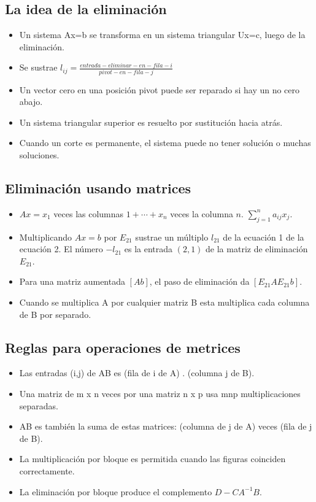 \documentclass[]{article}
\begin{document}
\subsection{La idea de la eliminaci\'on}

\begin{itemize}
	\item Un sistema Ax=b se transforma en un sistema triangular Ux=c, luego de la eliminación.
	\item Se sustrae $l_{ij}=\frac{entrada-eliminar-en-fila-i}{pivot-en-fila-j}$
	\item Un vector cero en una posición pivot puede ser reparado si hay un no cero abajo.
	\item Un sistema triangular superior es resuelto por sustitución hacia atrás.
	\item Cuando un corte es permanente, el sistema puede no tener solución o muchas soluciones.
\end{itemize}

\subsection{Eliminaci\'on usando matrices}

\begin{itemize}
	\item $Ax=x_{1}$ veces las columnas $1+\cdots+x_{n}$ veces la columna $n$. $\sum_{j=1}^n a_{ij}x_{j}$.
	\item Multiplicando $Ax=b$ por $E_{21}$ sustrae un múltiplo $l_{21}$ de la ecuación 1 de la ecuación 2. El número $-l_{21}$ es la entrada $(2,1)$ de la matriz de eliminación $E_{21}$.
	\item Para una matriz aumentada $[A b]$, el paso de eliminación da $[E_{21}A E_{21} b]$.
	\item Cuando se multiplica A por cualquier matriz B esta multiplica cada columna de B por separado.
\end{itemize}

\subsection{Reglas para operaciones de metrices}

\begin{itemize}
	\item Las entradas (i,j) de AB es (fila de i de A) . (columna j de B).
	\item Una matriz de m x n veces por una matriz n x p usa mnp multiplicaciones separadas.
	\item AB es también la suma de estas matrices: (columna de j de A) veces (fila de j de B).
	\item La multiplicación por bloque es permitida cuando las figuras coinciden correctamente.
	\item La eliminación por bloque produce el complemento $D-CA^{-1}B$.
\end{itemize}
\end{document}
